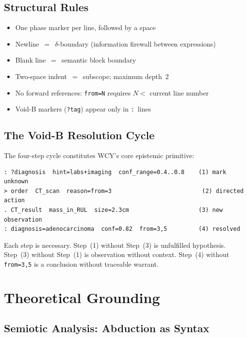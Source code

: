 \documentclass[11pt,a4paper]{article}
\begin{document}
\subsection{Structural Rules}

\begin{itemize}[leftmargin=*,itemsep=2pt]
  \item One phase marker per line, followed by a space
  \item Newline~$=$~$\delta$-boundary (information firewall between expressions)
  \item Blank line~$=$~semantic block boundary
  \item Two-space indent~$=$~subscope; maximum depth~2
  \item No forward references: \texttt{from=N} requires $N <$ current line number
  \item Void-B markers (\texttt{?tag}) appear only in \texttt{:}~lines
\end{itemize}

\subsection{The Void-B Resolution Cycle}

The four-step cycle constitutes WCY's core epistemic primitive:

\begin{lstlisting}
: ?diagnosis  hint=labs+imaging  conf_range=0.4..0.8    (1) mark unknown
> order  CT_scan  reason=from=3                          (2) directed action
. CT_result  mass_in_RUL  size=2.3cm                    (3) new observation
: diagnosis=adenocarcinoma  conf=0.82  from=3,5         (4) resolved
\end{lstlisting}

Each step is necessary. Step~(1) without Step~(3) is unfulfilled hypothesis. Step~(3) without Step~(1) is observation without context. Step~(4) without \texttt{from=3,5} is a conclusion without traceable warrant.

\section{Theoretical Grounding}
\label{sec:theory}

\subsection{Semiotic Analysis: Abduction as Syntax}
\end{document}
